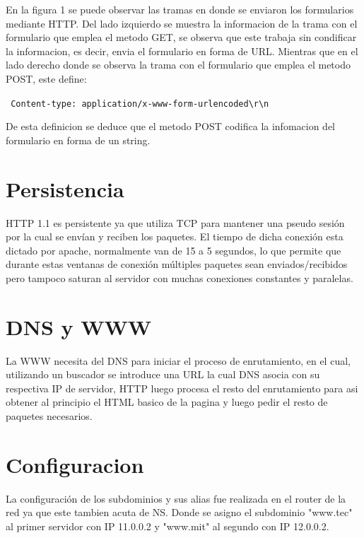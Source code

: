 \documentclass[12pt,a4paper]{article}
\begin{document}
	En la figura 1 se puede observar las tramas en donde se enviaron los formularios mediante HTTP. Del lado izquierdo se muestra la informacion de la trama con el formulario que emplea el metodo GET, se observa que este trabaja sin condificar la informacion, es decir, envia el formulario en forma de URL. Mientras que en el lado derecho donde se observa la trama con el formulario que emplea el metodo POST, este define:
	
	\verb| Content-type: application/x-www-form-urlencoded\r\n|
	
	De esta definicion se deduce que el metodo POST codifica la infomacion del formulario en forma de un string.
	
	\section{Persistencia}
	HTTP 1.1 es persistente ya que utiliza TCP para mantener una pseudo sesión por la cual se envían y reciben los paquetes. El tiempo de dicha conexión esta dictado por apache, normalmente van de 15 a 5 segundos, lo que permite que durante estas ventanas de conexión múltiples paquetes sean enviados/recibidos pero tampoco saturan al servidor con muchas conexiones constantes y paralelas.
	\section{DNS y WWW}
	La WWW necesita del DNS para iniciar el proceso de enrutamiento, en el cual, utilizando un buscador se introduce una URL la cual DNS asocia con su respectiva IP de servidor, HTTP luego procesa el resto del enrutamiento para asi obtener al principio el HTML basico de la pagina y luego pedir el resto de paquetes necesarios.
	
	\section{Configuracion}
	La configuración de los subdominios y sus alias fue realizada en el router de la red ya que este tambien acuta de NS. Donde se asigno el subdominio "www.tec" al primer servidor con IP 11.0.0.2 y "www.mit" al segundo con IP 12.0.0.2.
	
	
\end{document}
